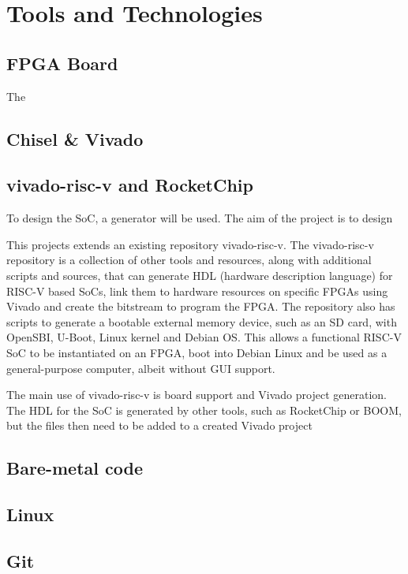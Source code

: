 \chapter{Tools and Technologies}
\label{ch:tools_technologies}
\section{FPGA Board}
The 

\section{Chisel & Vivado}
\section{vivado-risc-v and RocketChip} %
To design the SoC, a generator will be used. The aim of the project is to design 

This projects extends an existing repository vivado-risc-v\cite{vivado-risc-v}. The vivado-risc-v repository is a collection of other tools and resources, along with additional scripts and sources, that can generate HDL (hardware description language) for RISC-V based SoCs, link them to hardware resources on specific FPGAs using Vivado and create the bitstream to program the FPGA. The repository also has scripts to generate a bootable external memory device, such as an SD card, with OpenSBI, U-Boot, Linux kernel and Debian OS. This allows a functional RISC-V SoC to be instantiated on an FPGA, boot into Debian Linux and be used as a general-purpose computer, albeit without GUI support.

The main use of vivado-risc-v is board support and Vivado project generation. The HDL for the SoC is generated by other tools, such as RocketChip\cite{rocketchip} or BOOM\cite{boom-core}, but the files then need to be added to a created Vivado project

\section{Bare-metal code}
\section{Linux}
\section{Git}